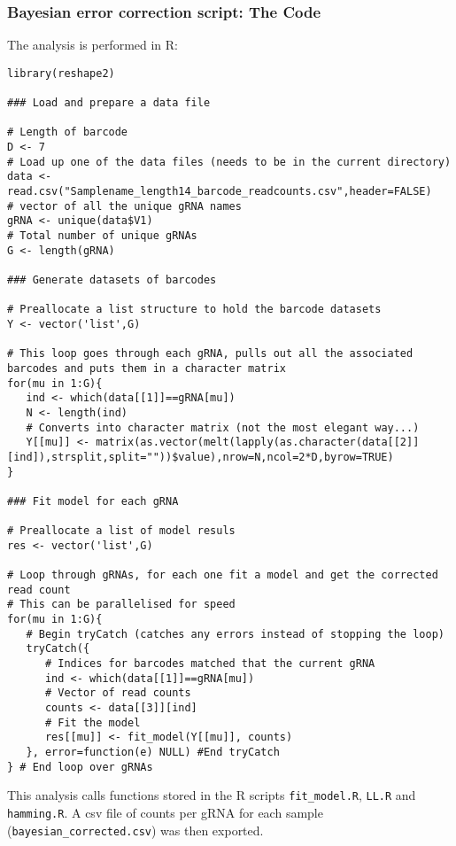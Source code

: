 \subsubsection{Bayesian error correction script: The Code}

The analysis is  performed in R:

\begin{small}\begin{lstlisting}
library(reshape2)

### Load and prepare a data file

# Length of barcode
D <- 7
# Load up one of the data files (needs to be in the current directory)
data <- read.csv("Samplename_length14_barcode_readcounts.csv",header=FALSE)
# vector of all the unique gRNA names
gRNA <- unique(data$V1)
# Total number of unique gRNAs
G <- length(gRNA)

### Generate datasets of barcodes

# Preallocate a list structure to hold the barcode datasets
Y <- vector('list',G)

# This loop goes through each gRNA, pulls out all the associated barcodes and puts them in a character matrix
for(mu in 1:G){
   ind <- which(data[[1]]==gRNA[mu])
   N <- length(ind)
   # Converts into character matrix (not the most elegant way...)
   Y[[mu]] <- matrix(as.vector(melt(lapply(as.character(data[[2]][ind]),strsplit,split=""))$value),nrow=N,ncol=2*D,byrow=TRUE)
}

### Fit model for each gRNA

# Preallocate a list of model resuls
res <- vector('list',G)

# Loop through gRNAs, for each one fit a model and get the corrected read count
# This can be parallelised for speed
for(mu in 1:G){
   # Begin tryCatch (catches any errors instead of stopping the loop)
   tryCatch({
      # Indices for barcodes matched that the current gRNA
      ind <- which(data[[1]]==gRNA[mu])
      # Vector of read counts
      counts <- data[[3]][ind]
      # Fit the model
      res[[mu]] <- fit_model(Y[[mu]], counts)
   }, error=function(e) NULL) #End tryCatch
} # End loop over gRNAs
\end{lstlisting}\end{small}

This analysis calls functions stored in the R scripts \verb|fit_model.R|, \verb|LL.R| and \verb|hamming.R|.
A csv file of counts per gRNA for each sample (\verb|bayesian_corrected.csv|) was then exported.

